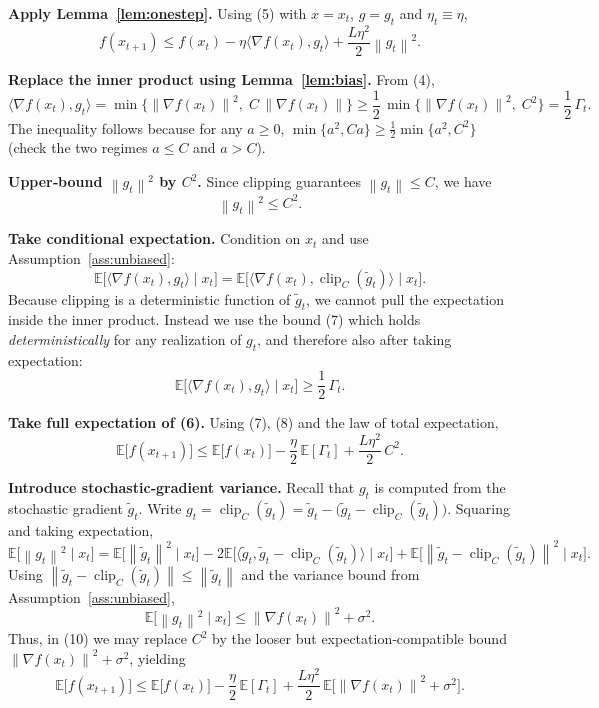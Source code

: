 \documentclass{article}
\newcommand{\EE}{\mathbb{E}}
\newcommand{\norm}[1]{\left\lVert #1\right\rVert}
\begin{document}
\begin{enumerate}[label={[\textbf{Step \arabic*}]}]
\item \textbf{Apply Lemma~\ref{lem:onestep}.}
Using (5) with $x=x_t$, $g=g_t$ and $\eta_t\equiv\eta$,
\[
f(x_{t+1})\le f(x_t)-\eta\langle\nabla f(x_t),g_t\rangle+\frac{L\eta^2}{2}\norm{g_t}^2 .
\tag{6}
\]

\item \textbf{Replace the inner product using Lemma~\ref{lem:bias}.}
From (4),
\[
\langle\nabla f(x_t),g_t\rangle
= \min\bigl\{\norm{\nabla f(x_t)}^2,\;C\,\norm{\nabla f(x_t)}\bigr\}
\ge \frac{1}{2}\,\min\bigl\{\norm{\nabla f(x_t)}^2,\;C^2\bigr\}
= \frac{1}{2}\,\Gamma_t .
\tag{7}
\]
The inequality follows because for any $a\ge0$,
$\min\{a^2,Ca\}\ge \tfrac12\min\{a^2,C^2\}$ (check the two regimes $a\le C$ and $a>C$).

\item \textbf{Upper‑bound $\norm{g_t}^2$ by $C^2$.}
Since clipping guarantees $\norm{g_t}\le C$, we have
\[
\norm{g_t}^2\le C^2 .
\tag{8}
\]

\item \textbf{Take conditional expectation.}
Condition on $x_t$ and use Assumption~\ref{ass:unbiased}:
\[
\EE\bigl[\langle\nabla f(x_t),g_t\rangle\mid x_t\bigr]
= \EE\bigl[\langle\nabla f(x_t),\operatorname{clip}_C(\tilde g_t)\rangle\mid x_t\bigr].
\]
Because clipping is a deterministic function of $\tilde g_t$, we cannot pull the expectation inside the inner product. Instead we use the bound (7) which holds \emph{deterministically} for any realization of $g_t$, and therefore also after taking expectation:
\[
\EE\bigl[\langle\nabla f(x_t),g_t\rangle\mid x_t\bigr]\ge \frac{1}{2}\,\Gamma_t .
\tag{9}
\]

\item \textbf{Take full expectation of (6).}
Using (7), (8) and the law of total expectation,
\[
\EE\bigl[f(x_{t+1})\bigr]
\le \EE\bigl[f(x_t)\bigr]
-\frac{\eta}{2}\,\EE[\Gamma_t]
+\frac{L\eta^2}{2}\,C^2 .
\tag{10}
\]

\item \textbf{Introduce stochastic‑gradient variance.}
Recall that $g_t$ is computed from the stochastic gradient $\tilde g_t$.
Write $g_t = \operatorname{clip}_C(\tilde g_t)=\tilde g_t -\bigl(\tilde g_t-\operatorname{clip}_C(\tilde g_t)\bigr)$.
Squaring and taking expectation,
\[
\EE\bigl[\norm{g_t}^2\mid x_t\bigr]
= \EE\bigl[\norm{\tilde g_t}^2\mid x_t\bigr]
   -2\EE\bigl[\langle\tilde g_t,\tilde g_t-\operatorname{clip}_C(\tilde g_t)\rangle\mid x_t\bigr]
   +\EE\bigl[\norm{\tilde g_t-\operatorname{clip}_C(\tilde g_t)}^2\mid x_t\bigr].
\]
Using $\norm{\tilde g_t-\operatorname{clip}_C(\tilde g_t)}\le \norm{\tilde g_t}$ and the variance bound from Assumption~\ref{ass:unbiased},
\[
\EE\bigl[\norm{g_t}^2\mid x_t\bigr]\le \norm{\nabla f(x_t)}^2 + \sigma^2 .
\tag{11}
\]
Thus, in (10) we may replace $C^2$ by the looser but expectation‑compatible bound $\norm{\nabla f(x_t)}^2+\sigma^2$, yielding
\[
\EE\bigl[f(x_{t+1})\bigr]
\le \EE\bigl[f(x_t)\bigr]
-\frac{\eta}{2}\,\EE[\Gamma_t]
+\frac{L\eta^2}{2}\,\EE\!\bigl[\norm{\nabla f(x_t)}^2+\sigma^2\bigr].
\tag{12}
\]


\end{enumerate}
\end{document}
